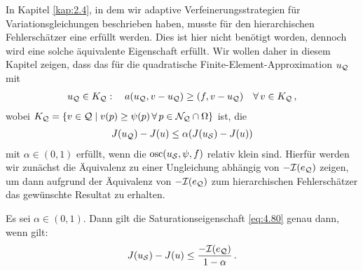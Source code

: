 In Kapitel \ref{kap:2.4}, in dem wir adaptive Verfeinerungsstrategien für Variationsgleichungen beschrieben haben, musste für den hierarchischen Fehlerschätzer eine  erfüllt werden. Dies ist hier nicht benötigt worden, dennoch wird eine solche äquivalente Eigenschaft erfüllt. Wir wollen daher in diesem Kapitel zeigen, dass das für die quadratische Finite-Element-Approximation $u_{\mathcal Q}$ mit
\begin{align}\label{eq:4.79}
	u_{\mathcal Q} \in K_{\mathcal Q} : \quad a(u_{\mathcal Q}, v-u_{\mathcal Q}) \ge (f,v-u_{\mathcal Q}) \quad \forall \, v \in K_{\mathcal Q} \, ,
\end{align}
wobei $K_{\mathcal Q} = \{v \in \mathcal Q \mid v(p)\ge \psi(p) \, \forall \, p \in \mathcal N_{\mathcal Q} \cap \Omega\}$ ist, die 
\begin{align}\label{eq:4.80}
	J(u_{\mathcal Q})-J(u) \le \alpha (J(u_{\mathcal S})-J(u))
\end{align}
mit $\alpha \in (0,1)$ erfüllt, wenn die  $\operatorname{osc} (u_{\mathcal S},\psi,f)$ relativ klein sind. Hierfür werden wir zunächst die Äquivalenz zu einer Ungleichung abhängig von $-\mathcal I(e_{\mathcal Q})$ zeigen, um dann aufgrund der Äquivalenz von $-\mathcal I(e_{\mathcal Q})$ zum hierarchischen Fehlerschätzer das gewünschte Resultat zu erhalten.


\begin{lemma}\label{lem:4.26}
Es sei $\alpha \in (0,1)$. Dann gilt die Saturationseigenschaft \eqref{eq:4.80} genau dann, wenn gilt:
\begin{align}\label{eq:4.81}
	J(u_{\mathcal S}) - J(u) \le \frac{-\mathcal I (e_{\mathcal Q})}{1-\alpha} \, .
\end{align}
\end{lemma}

